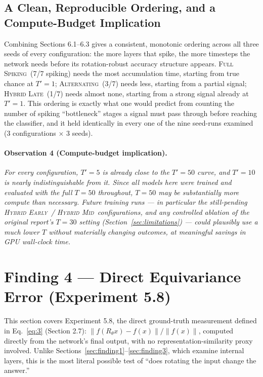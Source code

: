 \documentclass[11pt]{article}
\newcommand{\Alternating}{\textsc{Alternating}}
\newcommand{\FullSpiking}{\textsc{Full Spiking}}
\newcommand{\HybridLate}{\textsc{Hybrid Late}}
\newcommand{\HybridEarly}{\textsc{Hybrid Early}}
\newcommand{\HybridMid}{\textsc{Hybrid Mid}}
\begin{document}
\subsection{A Clean, Reproducible Ordering, and a Compute-Budget Implication}

Combining Sections 6.1--6.3 gives a consistent, monotonic ordering across all three seeds of every
configuration: the more layers that spike, the more timesteps the network needs before its
rotation-robust accuracy structure appears. \FullSpiking\ (7/7 spiking) needs the most accumulation
time, starting from true chance at $T' = 1$; \Alternating\ (3/7) needs less, starting from a partial
signal; \HybridLate\ (1/7) needs almost none, starting from a strong signal already at $T' = 1$. This
ordering is exactly what one would predict from counting the number of spiking ``bottleneck'' stages
a signal must pass through before reaching the classifier, and it held identically in every one of
the nine seed-runs examined (3 configurations $\times$ 3 seeds).

\paragraph{Observation 4 (Compute-budget implication).} \textit{For every configuration, $T' = 5$ is
already close to the $T' = 50$ curve, and $T' = 10$ is nearly indistinguishable from it. Since all
models here were trained and evaluated with the full $T = 50$ throughout, $T = 50$ may be
substantially more compute than necessary. Future training runs --- in particular the still-pending
\HybridEarly\ / \HybridMid\ configurations, and any controlled ablation of the original report's
$T = 30$ setting (Section~\ref{sec:limitations}) --- could plausibly use a much lower $T$ without
materially changing outcomes, at meaningful savings in GPU wall-clock time.}

\section{Finding 4 --- Direct Equivariance Error (Experiment 5.8)}
\label{sec:finding4}

This section covers Experiment 5.8, the direct ground-truth measurement defined in Eq.~\ref{eq:3}
(Section 2.7): $\| f(R_\theta x) - f(x) \| / \| f(x) \|$, computed directly from the network's final
output, with no representation-similarity proxy involved. Unlike Sections~\ref{sec:finding1}--\ref{sec:finding3},
which examine internal layers, this is the most literal possible test of ``does rotating the input
change the answer.''
\end{document}
